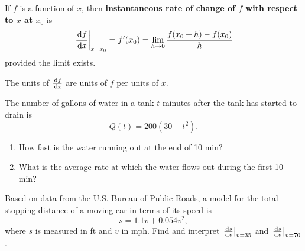 \setcounter{chapter}{3}
\setcounter{section}{4}
\setcounter{theorem}{0}
\setcounter{equation}{0}


\begin{definition}
If $f$ is a function of $x$, then \textbf{instantaneous rate of change of $f$ with respect to $x$ at $x_0$} is
\begin{equation*}
\left.\frac{\mkern 2mu \mathrm{d} f}{\mkern 2mu \mathrm{d} x}\right|_{x=x_0} = f'(x_0) = \lim_{h\to 0}\frac{f(x_0+h) - f(x_0)}{h}
\end{equation*}
provided the limit exists.
\end{definition}
\begin{remark}
The units of $\frac{\mkern 2mu \mathrm{d} f}{\mkern 2mu \mathrm{d} x}$ are units of $f$ per units of $x$.
\end{remark}
%

\begin{example}
The number of gallons of water in a tank $t$ minutes after the tank has started to drain is
\begin{equation*}
Q(t) = 200(30-t^2).
\end{equation*}
\begin{enumerate}[label=(\alph*)]
\item How fast is the water running out at the end of 10 min?
\vfill
\item What is the average rate at which the water flows out during the first 10 min?
\vfill
\end{enumerate}
\end{example}

\newpage

\begin{example}
Based on data from the U.S. Bureau of Public Roads, a model for the total stopping distance of a moving car in terms of its speed is
\begin{equation*}
s = 1.1v + 0.054 v^2,
\end{equation*}
where $s$ is measured in \si{ft} and $v$ in \si{mph}.
Find and interpret $\left.\frac{\mkern 2mu \mathrm{d} s}{\mkern 2mu \mathrm{d} v}\right|_{v=35}$ and $\left.\frac{\mkern 2mu \mathrm{d} s}{\mkern 2mu \mathrm{d} v}\right|_{v=70}$.
\end{example}

\newpage

